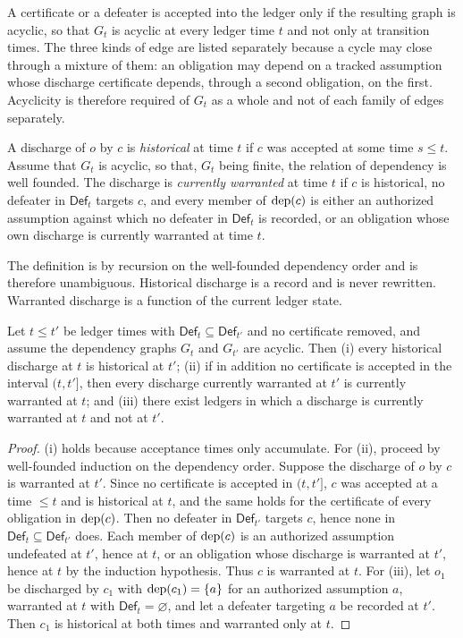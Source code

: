 A certificate or a defeater is accepted into the ledger only if the resulting graph is acyclic, so that $G_t$ is acyclic at every ledger time $t$ and not only at transition times. The three kinds of edge are listed separately because a cycle may close through a mixture of them: an obligation may depend on a tracked assumption whose discharge certificate depends, through a second obligation, on the first. Acyclicity is therefore required of $G_t$ as a whole and not of each family of edges separately.

\begin{definition}
\label{def:warranted}
A discharge of $o$ by $c$ is \emph{historical} at time $t$ if $c$ was accepted at some time $s \le t$. Assume that $G_t$ is acyclic, so that, $G_t$ being finite, the relation of dependency is well founded. The discharge is \emph{currently warranted} at time $t$ if $c$ is historical, no defeater in $\mathsf{Def}_t$ targets $c$, and every member of $\operatorname{dep}(c)$ is either an authorized assumption against which no defeater in $\mathsf{Def}_t$ is recorded, or an obligation whose own discharge is currently warranted at time $t$.
\end{definition}

The definition is by recursion on the well-founded dependency order and is therefore unambiguous. Historical discharge is a record and is never rewritten. Warranted discharge is a function of the current ledger state.

\begin{proposition}
\label{prop:defeasible}
Let $t \le t'$ be ledger times with $\mathsf{Def}_t \subseteq \mathsf{Def}_{t'}$ and no certificate removed, and assume the dependency graphs $G_t$ and $G_{t'}$ are acyclic. Then (i) every historical discharge at $t$ is historical at $t'$; (ii) if in addition no certificate is accepted in the interval $(t,t']$, then every discharge currently warranted at $t'$ is currently warranted at $t$; and (iii) there exist ledgers in which a discharge is currently warranted at $t$ and not at $t'$.
\end{proposition}

\begin{proof}
(i) holds because acceptance times only accumulate. For (ii), proceed by well-founded induction on the dependency order. Suppose the discharge of $o$ by $c$ is warranted at $t'$. Since no certificate is accepted in $(t,t']$, $c$ was accepted at a time $\le t$ and is historical at $t$, and the same holds for the certificate of every obligation in $\operatorname{dep}(c)$. Then no defeater in $\mathsf{Def}_{t'}$ targets $c$, hence none in $\mathsf{Def}_t \subseteq \mathsf{Def}_{t'}$ does. Each member of $\operatorname{dep}(c)$ is an authorized assumption undefeated at $t'$, hence at $t$, or an obligation whose discharge is warranted at $t'$, hence at $t$ by the induction hypothesis. Thus $c$ is warranted at $t$. For (iii), let $o_1$ be discharged by $c_1$ with $\operatorname{dep}(c_1) = \{a\}$ for an authorized assumption $a$, warranted at $t$ with $\mathsf{Def}_t = \varnothing$, and let a defeater targeting $a$ be recorded at $t'$. Then $c_1$ is historical at both times and warranted only at $t$.
\end{proof}

